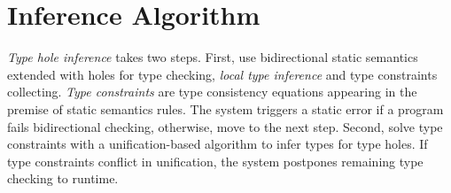 \section{Inference Algorithm}
\label{sec:infalg}
\emph{Type hole inference} takes two steps. First, use bidirectional static semantics extended with holes for type checking, \emph{local type inference} and type constraints collecting. \emph{Type constraints} are type consistency equations appearing in the premise of static semantics rules. The system triggers a static error if a program fails bidirectional checking, otherwise, move to the next step. Second, solve type constraints with a unification-based algorithm to infer types for type holes. If type constraints conflict in unification, the system postpones remaining type checking to runtime. 